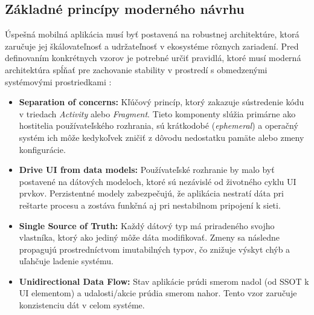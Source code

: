 \subsection{Základné princípy moderného návrhu}
Úspešná mobilná aplikácia musí byť postavená na robustnej architektúre, ktorá zaručuje jej 
škálovateľnosť a udržateľnosť v ekosystéme rôznych zariadení.
Pred definovaním konkrétnych vzorov je potrebné určiť pravidlá, ktoré musí moderná architektúra spĺňať pre zachovanie stability v prostredí s obmedzenými systémovými prostriedkami \cite{google_android_architecture}:

\begin{itemize}[noitemsep]
    \item \textbf{Separation of concerns:} Kľúčový princíp, ktorý zakazuje sústredenie kódu v triedach \textit{Activity} alebo \textit{Fragment}. Tieto komponenty slúžia primárne ako hostitelia používateľského rozhrania, sú krátkodobé (\textit{ephemeral}) a operačný systém ich môže kedykoľvek zničiť z dôvodu nedostatku pamäte alebo zmeny konfigurácie.
    \item \textbf{Drive UI from data models:} Používateľské rozhranie by malo byť postavené na dátových modeloch, ktoré sú nezávislé od životného cyklu UI prvkov. Perzistentné modely zabezpečujú, že aplikácia nestratí dáta pri reštarte procesu a zostáva funkčná aj pri nestabilnom pripojení k sieti.
    \item \textbf{Single Source of Truth:} Každý dátový typ má priradeného svojho vlastníka, ktorý ako jediný môže dáta modifikovať. Zmeny sa následne propagujú prostredníctvom imutabilných typov, čo znižuje výskyt chýb a uľahčuje ladenie systému.
    \item \textbf{Unidirectional Data Flow:} Stav aplikácie prúdi smerom nadol (od SSOT k UI elementom) a udalosti/akcie prúdia smerom nahor. Tento vzor zaručuje konzistenciu dát v celom systéme.
\end{itemize}\cite{google_android_architecture}

